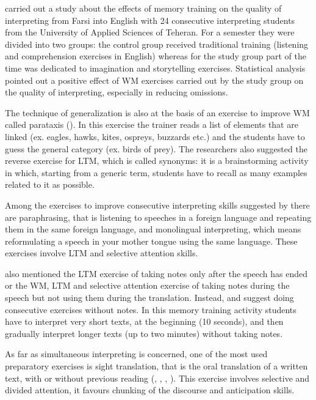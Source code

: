 \documentclass[output=paper]{../langscibook}
\begin{document}
\citet{YenkimalekivanHeuven2017} carried out a study about the effects of memory training on the quality of interpreting from Farsi into English with 24 consecutive interpreting students from the University of Applied Sciences of Teheran. For a semester they were divided into two groups: the control group received traditional training (listening and comprehension exercises in English) whereas for the study group part of the time was dedicated to imagination and storytelling exercises. Statistical analysis pointed out a positive effect of WM exercises carried out by the study group on the quality of interpreting, especially in reducing omissions.

The technique of generalization is also at the basis of an exercise to improve WM called parataxis (\citealt{BallesterJiminezHurtado1992}). In this exercise the trainer reads a list of elements that are linked (ex. eagles, hawks, kites, ospreys, buzzards etc.) and the students have to guess the general category (ex. birds of prey). The researchers also suggested the reverse exercise for LTM, which is called synonyms: it is a brainstorming activity in which, starting from a generic term, students have to recall as many examples related to it as possible.

Among the exercises to improve consecutive interpreting skills suggested by \citet{Gillies2013} there are paraphrasing, that is listening to speeches in a foreign language and repeating them in the same foreign language, and monolingual interpreting, which means reformulating a speech in your mother tongue using the same language. These exercises involve LTM and selective attention skills.

\citet{Gillies2013} also mentioned the LTM exercise of taking notes only after the speech has ended or the WM, LTM and selective attention exercise of taking notes during the speech but not using them during the translation. Instead, \citet{ChabasseDingerfelderStone2015} and \citet{SettonDawrant2016a} suggest doing consecutive exercises without notes. In this memory training activity students have to interpret very short texts, at the beginning (10 seconds), and then gradually interpret longer texts (up to two minutes) without taking notes.

As far as simultaneous interpreting is concerned, one of the most used preparatory exercises is sight translation, that is the oral translation of a written text, with or without previous reading (\citealt{Kalina1992,Kalina2000}, \citealt{PadillaBenitez2002}, \citealt{Gillies2013}, \citealt{SettonDawrant2016a}). This exercise involves selective and divided attention, it favours chunking of the discourse and anticipation skills.
\end{document}
